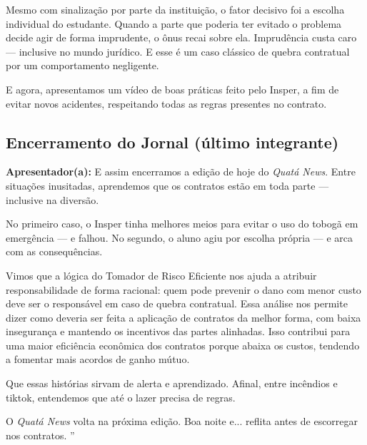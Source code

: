 \documentclass[a4paper,12pt]{article}[abntex2]
\begin{document}
Mesmo com sinalização por parte da instituição, o fator decisivo foi a escolha individual do estudante.
Quando a parte que poderia ter evitado o problema decide agir de forma imprudente, o ônus recai sobre ela. Imprudência custa caro — inclusive no mundo jurídico.
E esse é um caso clássico de quebra contratual por um comportamento negligente.\newline

E agora, apresentamos um vídeo de boas práticas feito pelo Insper, a fim de evitar novos acidentes, respeitando todas as regras presentes no contrato.


\subsection*{Encerramento do Jornal (último integrante)}
\textbf{Apresentador(a):}
E assim encerramos a edição de hoje do \textit{Quatá News}. Entre situações inusitadas, aprendemos que os contratos estão em toda parte — inclusive na diversão.

No primeiro caso, o Insper tinha melhores meios para evitar o uso do tobogã em emergência — e falhou. No segundo, o aluno agiu por escolha própria — e arca com as consequências.\newline

Vimos que a lógica do Tomador de Risco Eficiente nos ajuda a atribuir responsabilidade de forma racional: quem pode prevenir o dano com menor custo deve ser o responsável em caso de quebra contratual. Essa análise nos permite dizer como deveria ser feita a aplicação de contratos da melhor forma, com baixa insegurança e mantendo os incentivos das partes alinhadas. Isso contribui para uma maior eficiência econômica dos contratos porque abaixa os custos, tendendo a fomentar mais acordos de ganho mútuo. \newline

Que essas histórias sirvam de alerta e aprendizado. Afinal, entre incêndios e tiktok, entendemos que até o lazer precisa de regras.\newline

O \textit{Quatá News} volta na próxima edição. Boa noite e... reflita antes de escorregar nos contratos. ”
\end{document}
